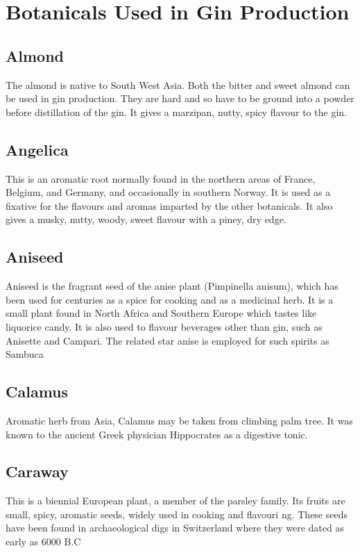 \section{Botanicals Used in Gin Production}

\subsection{Almond}
The almond is native to South West Asia. Both the bitter and sweet almond can
be used in gin production. They are hard and so have to be ground into a powder
before distillation of the gin. It gives a marzipan, nutty, spicy flavour to
the gin.  

\subsection{Angelica}
This is an aromatic root normally found in the northern areas of France,
Belgium, and Germany, and occasionally in southern Norway. It is used as a
fixative for the flavours and aromas imparted by the other botanicals. It also
gives a musky, nutty, woody, sweet flavour with a piney, dry edge.  

\subsection{Aniseed}
Aniseed is the fragrant seed of the anise plant (Pimpinella anisum), which has
been used for centuries as a spice for cooking and as a medicinal herb. It is a
small plant found in North Africa and Southern Europe which tastes like
liquorice candy. It is also used to flavour beverages other than gin, such as
Anisette and Campari. The related star anise is employed for such spirits as
Sambuca 

\subsection{Calamus}
Aromatic herb from Asia, Calamus may be taken from climbing palm tree. It was
known to the ancient Greek physician Hippocrates as a digestive tonic.  

\subsection{Caraway}
This is a biennial European plant, a member of the parsley family. Its fruits
are small, spicy, aromatic seeds, widely used in cooking and flavouri ng. These
seeds have been found in archaeological digs in Switzerland where they were
dated as early as 6000 B.C

